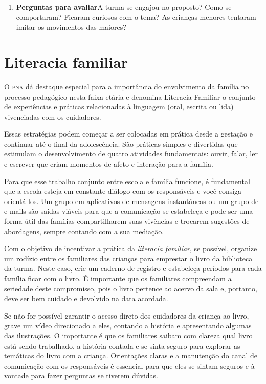 \documentclass[11pt]{extarticle}
\begin{document}
\begin{enumerate}
\item \textbf{Perguntas para avaliar}\quad A turma se engajou no proposto? Como se comportaram? Ficaram curiosos com o tema? As crianças menores tentaram imitar os movimentos das maiores? 
\end{enumerate}


\section{Literacia familiar}
O \textsc{pna} dá destaque especial para a importância do envolvimento da família 
no processo pedagógico nesta faixa etária e denomina Literacia Familiar o conjunto 
de experiências e práticas relacionadas à linguagem (oral, escrita ou lida) vivenciadas 
com os cuidadores. 

Essas estratégias podem começar a ser colocadas em prática desde a 
gestação e continuar até o final da adolescência. São práticas simples e divertidas 
que estimulam o desenvolvimento de quatro atividades fundamentais: ouvir, falar, 
ler e escrever que criam momentos de afeto e interação para a família. 

Para que esse trabalho conjunto entre escola e família funcione, é 
fundamental que a escola esteja em constante diálogo com os responsáveis e 
você consiga orientá-los. Um grupo em aplicativos de mensagens instantâneas ou um 
grupo de e-mails são saídas viáveis para que a comunicação se estabeleça e pode ser 
uma forma útil das famílias compartilharem suas vivências e trocarem sugestões 
de abordagens, sempre contando com a sua mediação. 

Com o objetivo de incentivar 
a prática da \textit{literacia familiar}, se possível, organize um rodízio entre os familiares 
das crianças para emprestar o livro da biblioteca da turma. Neste caso, crie um caderno 
de registro e estabeleça períodos para cada família ficar com o livro. É importante 
que os familiares compreendam a seriedade deste compromisso, pois o livro pertence 
ao acervo da sala e, portanto, deve ser bem cuidado e devolvido na data acordada. 

Se não for possível garantir o acesso direto dos cuidadores da criança ao livro, 
grave um vídeo direcionado a eles, contando a história e apresentando algumas 
das ilustrações. O importante é que os familiares saibam com clareza qual livro 
está sendo trabalhado, a história contada e se sinta seguro para explorar as temáticas 
do livro com a criança. Orientações claras e a manutenção do canal de comunicação com 
os responsáveis é essencial para que eles se sintam seguros e à vontade para fazer perguntas 
se tiverem dúvidas. 
\end{document}
